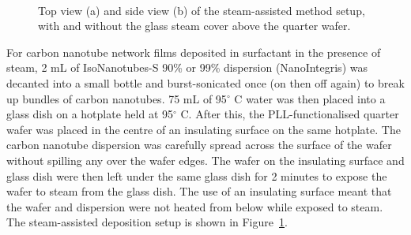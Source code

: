 \documentclass[
  letterpaper,
  DIV=11,
  numbers=noendperiod]{scrartcl}
\begin{document}
\begin{figure}

\begin{minipage}[t]{0.47\linewidth}

{\centering 


}

\subcaption{\label{fig-steaming-method-top}}
\end{minipage}%
%
\begin{minipage}[t]{0.05\linewidth}

{\centering 

~

}

\end{minipage}%
%
\begin{minipage}[t]{0.47\linewidth}

{\centering 


}

\subcaption{\label{fig-steaming-method-side}}
\end{minipage}%

\caption{\label{fig-steaming-method}Top view (a) and side view (b) of
the steam-assisted method setup, with and without the glass steam cover
above the quarter wafer.}

\end{figure}

For carbon nanotube network films deposited in surfactant in the
presence of steam, 2 mL of IsoNanotubes-S 90\% or 99\% dispersion
(NanoIntegris) was decanted into a small bottle and burst-sonicated once
(on then off again) to break up bundles of carbon nanotubes. 75 mL of
95\(^\circ\) C water was then placed into a glass dish on a hotplate
held at 95\(^\circ\) C. After this, the PLL-functionalised quarter wafer
was placed in the centre of an insulating surface on the same hotplate.
The carbon nanotube dispersion was carefully spread across the surface
of the wafer without spilling any over the wafer edges. The wafer on the
insulating surface and glass dish were then left under the same glass
dish for 2 minutes to expose the wafer to steam from the glass dish. The
use of an insulating surface meant that the wafer and dispersion were
not heated from below while exposed to steam. The steam-assisted
deposition setup is shown in Figure~\ref{fig-steaming-method}.
\end{document}
